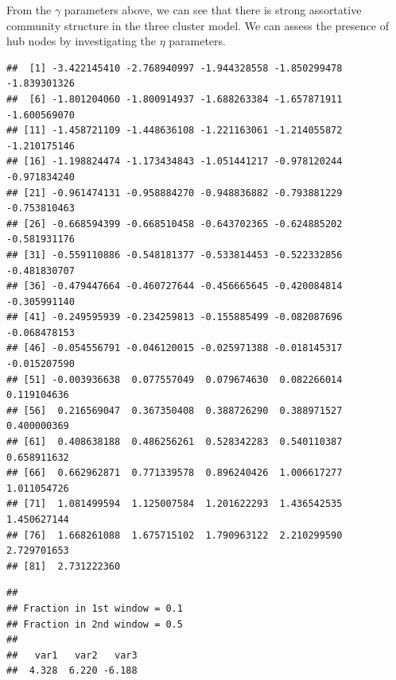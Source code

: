 \documentclass[]{article}
\newenvironment{Shaded}{\begin{snugshade}}{\end{snugshade}}
\newcommand{\DecValTok}[1]{\textcolor[rgb]{0.00,0.00,0.81}{#1}}
\newcommand{\KeywordTok}[1]{\textcolor[rgb]{0.13,0.29,0.53}{\textbf{#1}}}
\newcommand{\NormalTok}[1]{#1}
\newcommand{\OperatorTok}[1]{\textcolor[rgb]{0.81,0.36,0.00}{\textbf{#1}}}
\newcommand{\StringTok}[1]{\textcolor[rgb]{0.31,0.60,0.02}{#1}}
\begin{document}
From the \(\gamma\) parameters above, we can see that there is strong
assortative community structure in the three cluster model. We can
assess the presence of hub nodes by investigating the \(\eta\)
parameters.

\begin{Shaded}
\end{Shaded}

\begin{verbatim}
##  [1] -3.422145410 -2.768940997 -1.944328558 -1.850299478 -1.839301326
##  [6] -1.801204060 -1.800914937 -1.688263384 -1.657871911 -1.600569070
## [11] -1.458721109 -1.448636108 -1.221163061 -1.214055872 -1.210175146
## [16] -1.198824474 -1.173434843 -1.051441217 -0.978120244 -0.971834240
## [21] -0.961474131 -0.958884270 -0.948836882 -0.793881229 -0.753810463
## [26] -0.668594399 -0.668510458 -0.643702365 -0.624885202 -0.581931176
## [31] -0.559110886 -0.548181377 -0.533814453 -0.522332856 -0.481830707
## [36] -0.479447664 -0.460727644 -0.456665645 -0.420084814 -0.305991140
## [41] -0.249595939 -0.234259813 -0.155885499 -0.082087696 -0.068478153
## [46] -0.054556791 -0.046120015 -0.025971388 -0.018145317 -0.015207590
## [51] -0.003936638  0.077557049  0.079674630  0.082266014  0.119104636
## [56]  0.216569047  0.367350408  0.388726290  0.388971527  0.400000369
## [61]  0.408638188  0.486256261  0.528342283  0.540110387  0.658911632
## [66]  0.662962871  0.771339578  0.896240426  1.006617277  1.011054726
## [71]  1.081499594  1.125007584  1.201622293  1.436542535  1.450627144
## [76]  1.668261088  1.675715102  1.790963122  2.210299590  2.729701653
## [81]  2.731222360
\end{verbatim}

\begin{Shaded}
\end{Shaded}

\begin{verbatim}
## 
## Fraction in 1st window = 0.1
## Fraction in 2nd window = 0.5 
## 
##   var1   var2   var3 
##  4.328  6.220 -6.188
\end{verbatim}
\end{document}

